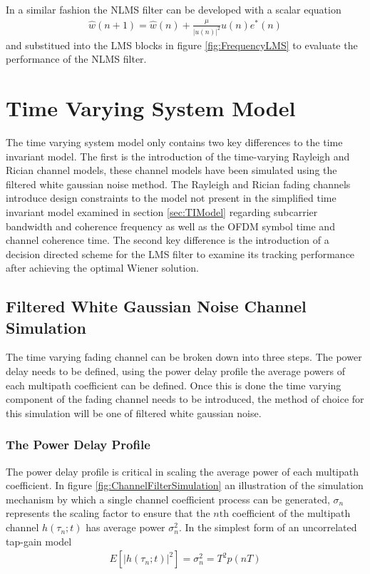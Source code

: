 In a similar fashion the NLMS filter can be developed with a scalar equation %
\begin{align}
	\hat{w}(n+1) = \hat{w}(n) + \frac{\mu}{\lvert u(n) \rvert^{2}} %
	u(n) e^{*}(n)
	\label{eq:ScalarNLMS}
\end{align}
and substitued into the LMS blocks in figure \ref{fig:FrequencyLMS} to %
evaluate the performance of the NLMS filter.

\section{Time Varying System Model}

The time varying system model only contains two key differences to the %
time invariant model. The first is the introduction of the time-varying Rayleigh %
and Rician channel models, these channel models have been simulated using %
the filtered white gaussian noise method. The Rayleigh and Rician fading %
channels introduce design constraints to the model not present in the %
simplified time invariant model examined in section %
\ref{sec:TIModel} regarding subcarrier bandwidth and coherence %
frequency as well as the OFDM symbol time and channel %
coherence time. The second key difference is the introduction %
of a decision directed scheme for the LMS %
filter to examine its tracking performance after achieving %
the optimal Wiener solution.

\subsection{Filtered White Gaussian Noise Channel Simulation}

The time varying fading channel can be broken down into three %
steps. The power delay needs to be defined, using the %
power delay profile the average powers of each multipath %
coefficient can be defined. Once this is done the time varying %
component of the fading channel needs to be introduced, %
the method of choice for this simulation will be one of filtered %
white gaussian noise. 
\subsubsection{The Power Delay Profile}

The power delay profile is critical in scaling the average power %
of each multipath coefficient. In figure \ref{fig:ChannelFilterSimulation} %
an illustration of the simulation mechanism by which a single channel %
coefficient process can be generated, $\sigma_{n}$ represents %
the scaling factor to ensure that the $n\text{th}$ coefficient %
of the multipath channel $h(\tau_{n};t)$ has average power %
$\sigma_{n}^{2}$. In the simplest form of an uncorrelated %
tap-gain model \cite{Jer00} 
\begin{align}
	E\left[\lvert h(\tau_{n};t) \rvert^{2} \right] = %
	\sigma_{n}^{2} = T^{2}p(nT)
	\label{eq:TapPower}
\end{align}

